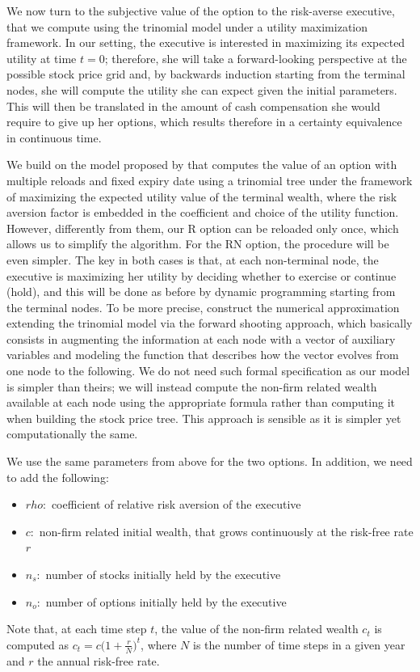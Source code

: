 
We now turn to the subjective value of the option to the risk-averse executive, that we compute using the trinomial model under a utility maximization framework. In our setting, the executive is interested in maximizing its expected utility at time $t=0$; therefore, she will take a forward-looking perspective at the possible stock price grid and, by backwards induction starting from the terminal nodes, she will compute the utility she can expect given the initial parameters. This will then be translated in the amount of cash compensation she would require to give up her options, which results therefore in a certainty equivalence in continuous time. 

We build on the model proposed by \cite{lau2005valuation} that computes the value of an option with multiple reloads and fixed expiry date using a trinomial tree under the framework of maximizing the expected utility value of the terminal wealth, where the risk aversion factor is embedded in the coefficient and choice of the utility function. However, differently from them, our R option can be reloaded only once, which allows us to simplify the algorithm. For the RN option, the procedure will be even simpler. The key in both cases is that, at each non-terminal node, the executive is maximizing her utility by deciding whether to exercise or continue (hold), and this will be done as before by dynamic programming starting from the terminal nodes.
To be more precise, \cite{lau2005valuation} construct the numerical approximation extending the trinomial model via the forward shooting approach, which basically consists in augmenting the information at each node with a vector of auxiliary variables and modeling the function that describes how the vector evolves from one node to the following. We do not need such formal specification as our model is simpler than theirs; we will instead compute the non-firm related wealth available at each node using the appropriate formula rather than computing it when building the stock price tree. This approach is sensible as it is simpler yet computationally the same.

We use the same parameters from above for the two options. In addition, we need to add the following: 
\begin{itemize}
    \item $rho: $ coefficient of relative risk aversion of the executive
    \item $c: $ non-firm related initial wealth, that grows continuously at the risk-free rate $r$
    \item $n_s: $ number of stocks initially held by the executive
    \item $n_o: $ number of options initially held by the executive
\end{itemize}
Note that, at each time step $t$, the value of the non-firm related wealth $c_t$ is computed as $c_t = c \bigl(1+\frac{r}{N}\bigr)^{t}$, where $N$ is the number of time steps in a given year and $r$ the annual risk-free rate. 


